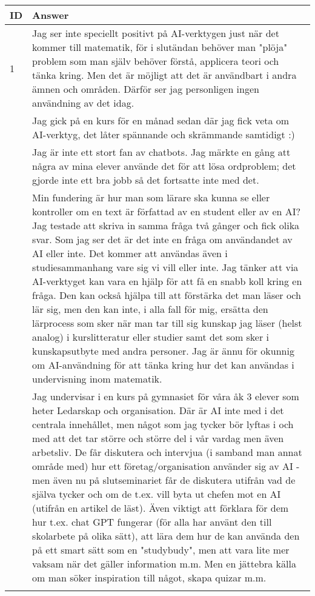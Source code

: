 \begin{table}[h]
\centering
{\tiny
\begin{tabularx}{\textwidth}{@{}lX@{}}
\toprule
\textbf{ID} & \textbf{Answer} \\ \midrule
1 & Jag ser inte speciellt positivt på AI-verktygen just när det kommer till matematik, för i slutändan behöver man "plöja" problem som man själv behöver förstå, applicera teori och tänka kring. Men det är möjligt att det är användbart i andra ämnen och områden. Därför ser jag personligen ingen användning av det idag. \\ \hdashline
2 & Jag gick på en kurs för en månad sedan där jag fick veta om AI-verktyg, det låter spännande och skrämmande samtidigt :) \\ \hdashline
3 & Jag är inte ett stort fan av chatbots. Jag märkte en gång att några av mina elever använde det för att lösa ordproblem; det gjorde inte ett bra jobb så det fortsatte inte med det. \\ \hdashline
4 & Min fundering är hur man som lärare ska kunna se eller kontroller om en text är författad av en student eller av en AI? Jag testade att skriva in samma fråga två gånger och fick olika svar. Som jag ser det är det inte en fråga om användandet av AI eller inte. Det kommer att användas även i studiesammanhang vare sig vi vill eller inte. Jag tänker att via AI-verktyget kan vara en hjälp för att få en snabb koll kring en fråga. Den kan också hjälpa till att förstärka det man läser och lär sig, men den kan inte, i alla fall för mig, ersätta den lärprocess som sker när man tar till sig kunskap jag läser (helst analog) i kurslitteratur eller studier samt det som sker i kunskapsutbyte med andra personer. Jag är ännu för okunnig om AI-användning för att tänka kring hur det kan användas i undervisning inom matematik. \\ \hdashline
5 & Jag undervisar i en kurs på gymnasiet för våra åk 3 elever som heter Ledarskap och organisation. Där är AI inte med i det centrala innehållet, men något som jag tycker bör lyftas i och med att det tar större och större del i vår vardag men även arbetsliv. De får diskutera och intervjua (i samband man annat område med) hur ett företag/organisation använder sig av AI - men även nu på slutseminariet får de diskutera utifrån vad de själva tycker och om de t.ex. vill byta ut chefen mot en AI (utifrån en artikel de läst). Även viktigt att förklara för dem hur t.ex. chat GPT fungerar (för alla har använt den till skolarbete på olika sätt), att lära dem hur de kan använda den på ett smart sätt som en "studybudy", men att vara lite mer vaksam när det gäller information m.m. Men en jättebra källa om man söker inspiration till något, skapa quizar m.m. \\ \hdashline

\end{tabularx}}
\end{table}
